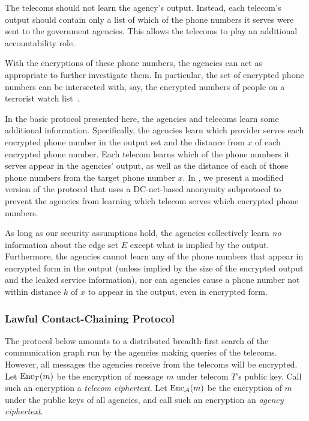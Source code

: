 The telecoms should not learn the agency's output. Instead, each telecom's output should contain only a list of which of the phone numbers it serves were sent to the government agencies. This allows the telecoms to play an additional accountability role. 

With the encryptions of these phone numbers, the agencies can act as appropriate to further investigate them. In particular, the set of encrypted phone numbers can be intersected with, say, the encrypted numbers of people on a terrorist
watch list~\cite{sff-foci2014}.

In the basic protocol presented here, the agencies and telecoms learn some additional information. Specifically, the agencies learn which provider serves each encrypted phone number in the output set and the distance from $x$ of each encrypted phone number. Each telecom learns which of the phone numbers it serves appear in the agencies' output, as well as the distance of each of those phone numbers from the target phone number $x$.
In \cite[Section 4.1.5]{sff-TR}, we present a modified version of the protocol that uses a DC-net-based anonymity subprotocol to prevent the agencies from learning which telecom serves which encrypted phone numbers.

As long as our security assumptions hold, the agencies collectively learn \emph{no} information about the edge set $E$ except what is implied by the output. Furthermore, the agencies cannot learn any of the phone numbers that appear in encrypted form in the output (unless implied by the size of the encrypted output and the leaked service information), nor can agencies cause a phone number not within distance $k$ of $x$ to appear in the output, even in encrypted form.

\subsubsection{Lawful Contact-Chaining Protocol}

\label{sec-proto1}

The protocol below amounts to a distributed breadth-first search of the communication graph run by the agencies making queries of the telecoms. However, all messages the agencies receive from the telecoms will be encrypted. 
Let $\operatorname{Enc}_T(m)$ be the encryption of message $m$ under telecom $T$'s public key. Call such an encryption a \emph{telecom ciphertext}. Let $\operatorname{Enc}_\mathcal{A}(m)$ be the encryption of $m$ under the public keys of all agencies, and call such an encryption an \emph{agency ciphertext}.

